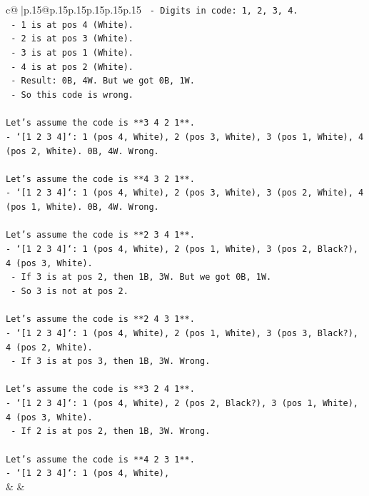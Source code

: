 \documentclass{article}
\begin{document}
{\begin{supertabular}{c@{$\;$}|p{.15\linewidth}@{}p{.15\linewidth}p{.15\linewidth}p{.15\linewidth}p{.15\linewidth}p{.15\linewidth}}
{{{\texttt{  {-} Digits in code: 1, 2, 3, 4.} \\
\texttt{  {-} 1 is at pos 4 (White).} \\
\texttt{  {-} 2 is at pos 3 (White).} \\
\texttt{  {-} 3 is at pos 1 (White).} \\
\texttt{  {-} 4 is at pos 2 (White).} \\
\texttt{  {-} Result: 0B, 4W. But we got 0B, 1W.} \\
\texttt{  {-} So this code is wrong.} \\
\\ 
\texttt{Let's assume the code is **3 4 2 1**.} \\
\texttt{{-} `{[}1 2 3 4{]}`: 1 (pos 4, White), 2 (pos 3, White), 3 (pos 1, White), 4 (pos 2, White). 0B, 4W. Wrong.} \\
\\ 
\texttt{Let's assume the code is **4 3 2 1**.} \\
\texttt{{-} `{[}1 2 3 4{]}`: 1 (pos 4, White), 2 (pos 3, White), 3 (pos 2, White), 4 (pos 1, White). 0B, 4W. Wrong.} \\
\\ 
\texttt{Let's assume the code is **2 3 4 1**.} \\
\texttt{{-} `{[}1 2 3 4{]}`: 1 (pos 4, White), 2 (pos 1, White), 3 (pos 2, Black?), 4 (pos 3, White).} \\
\texttt{  {-} If 3 is at pos 2, then 1B, 3W. But we got 0B, 1W.} \\
\texttt{  {-} So 3 is not at pos 2.} \\
\\ 
\texttt{Let's assume the code is **2 4 3 1**.} \\
\texttt{{-} `{[}1 2 3 4{]}`: 1 (pos 4, White), 2 (pos 1, White), 3 (pos 3, Black?), 4 (pos 2, White).} \\
\texttt{  {-} If 3 is at pos 3, then 1B, 3W. Wrong.} \\
\\ 
\texttt{Let's assume the code is **3 2 4 1**.} \\
\texttt{{-} `{[}1 2 3 4{]}`: 1 (pos 4, White), 2 (pos 2, Black?), 3 (pos 1, White), 4 (pos 3, White).} \\
\texttt{  {-} If 2 is at pos 2, then 1B, 3W. Wrong.} \\
\\ 
\texttt{Let's assume the code is **4 2 3 1**.} \\
\texttt{{-} `{[}1 2 3 4{]}`: 1 (pos 4, White),} \\
            }
        }
    }
    & & \\ \\


\end{supertabular}}
\end{document}
